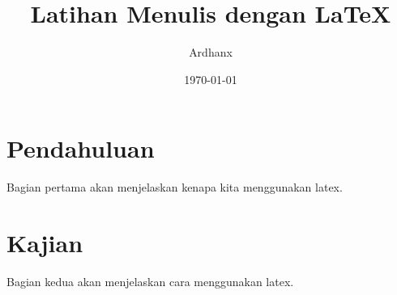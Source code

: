 \documentclass[a4paper,10pt,oneside]{article}
\title{Latihan Menulis dengan LaTeX}
\author{Ardhanx}
\date{\today}
\begin{document}
	\maketitle	
	
	\section{Pendahuluan}
	Bagian pertama akan menjelaskan kenapa kita menggunakan latex.
	
	\section{Kajian}
	Bagian kedua akan menjelaskan cara menggunakan latex.
	
\end{document}
